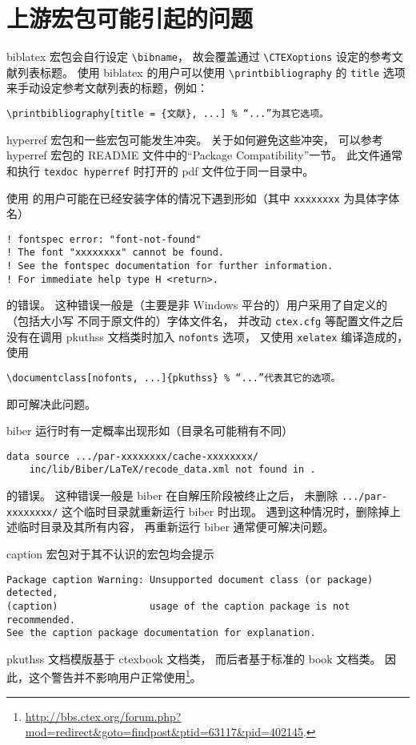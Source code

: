 	\section{上游宏包可能引起的问题}

	biblatex 宏包\supercite{biblatex}会自行设定 \verb|\bibname|，
	故会覆盖通过 \verb|\CTEXoptions| 设定的参考文献列表标题。
	使用 biblatex 的用户可以使用 \verb|\printbibliography| 的
	\verb|title| 选项来手动设定参考文献列表的标题，例如：
\begin{Verbatim}[frame = single]
\printbibliography[title = {文献}, ...] % “...”为其它选项。
\end{Verbatim}

	hyperref 宏包\supercite{hyperref}和一些宏包可能发生冲突。
	关于如何避免这些冲突，
	可以参考 hyperref 宏包的 README 文件中的“Package Compatibility”一节。
	此文件通常和执行 \verb|texdoc hyperref| %
	时打开的 pdf 文件位于同一目录中。

	使用  的用户可能在已经安装字体的情况下遇到形如（其中
	\verb|xxxxxxxx| 为具体字体名）
\begin{Verbatim}[frame = single, fontsize = {\small}]
! fontspec error: "font-not-found"
! The font "xxxxxxxx" cannot be found.
! See the fontspec documentation for further information.
! For immediate help type H <return>.
\end{Verbatim}
	的错误。
	这种错误一般是（主要是非 Windows 平台的）用户采用了自定义的（包括大小写
	不同于原文件的）字体文件名，
	并改动 \verb|ctex.cfg| 等配置文件之后没有在调用 %
	pkuthss 文档类时加入 \verb|nofonts| 选项，
	又使用 \verb|xelatex| 编译造成的，使用
\begin{Verbatim}[frame = single]
\documentclass[nofonts, ...]{pkuthss} % “...”代表其它的选项。
\end{Verbatim}
	即可解决此问题。

	biber 运行时有一定概率出现形如（目录名可能稍有不同）
\begin{Verbatim}[frame = single, fontsize = {\small}]
data source .../par-xxxxxxxx/cache-xxxxxxxx/
	inc/lib/Biber/LaTeX/recode_data.xml not found in .
\end{Verbatim}
	的错误。
	这种错误一般是 biber 在自解压阶段被终止之后，
	未删除 \verb|.../par-xxxxxxxx/| 这个临时目录就重新运行 biber 时出现。
	遇到这种情况时，删除掉上述临时目录及其所有内容，
	再重新运行 biber 通常便可解决问题。

	caption 宏包\supercite{caption}对于其不认识的宏包均会提示
\begin{Verbatim}[frame = single, fontsize = {\small}]
Package caption Warning: Unsupported document class (or package) detected,
(caption)                usage of the caption package is not recommended.
See the caption package documentation for explanation.
\end{Verbatim}
	pkuthss 文档模版基于 ctexbook 文档类，
	而后者基于标准的 book 文档类。
	因此，这个警告并不影响用户正常使用\footnote{%
		\url{http://bbs.ctex.org/forum.php?mod=redirect&goto=findpost&ptid=63117&pid=402145}.%
	}。

